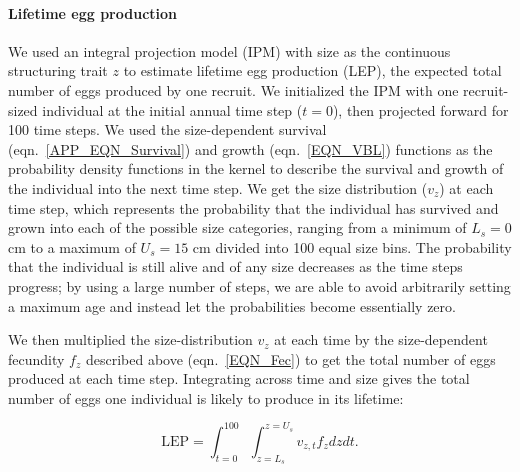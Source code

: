 \documentclass[12pt, oneside]{article}   	%
\begin{document}

\paragraph*{Lifetime egg production}
We used an integral projection model (IPM) \citep{ellner2016data} with size as the continuous structuring trait $z$ to estimate lifetime egg production (LEP), the expected total number of eggs produced by one recruit. We initialized the IPM with one recruit-sized individual at the initial annual time step ($t=0$), then projected forward for 100 time steps. We used the size-dependent survival (eqn.\ \ref{APP_EQN_Survival}) and growth (eqn.\ \ref{EQN_VBL}) functions as the probability density functions in the kernel to describe the survival and growth of the individual into the next time step. We get the size distribution ($v_z$) at each time step, which represents the probability that the individual has survived and grown into each of the possible size categories, ranging from a minimum of $L_s=0$ cm to a maximum of $U_s=15$ cm divided into 100 equal size bins. The probability that the individual is still alive and of any size decreases as the time steps progress; by using a large number of steps, we are able to avoid arbitrarily setting a maximum age and instead let the probabilities become essentially zero. %

We then multiplied the size-distribution $v_z$ at each time by the size-dependent fecundity $f_z$ described above (eqn.\ \ref{EQN_Fec}) to get the total number of eggs produced at each time step. Integrating across time and size gives the total number of eggs one individual is likely to produce in its lifetime:

\begin{equation}
\text{LEP} = \int_{t=0}^{100}\int_{z=L_s}^{z=U_s} v_{z,t} f_z dz dt. \label{EQN_LEP}
\end{equation}
\end{document}
